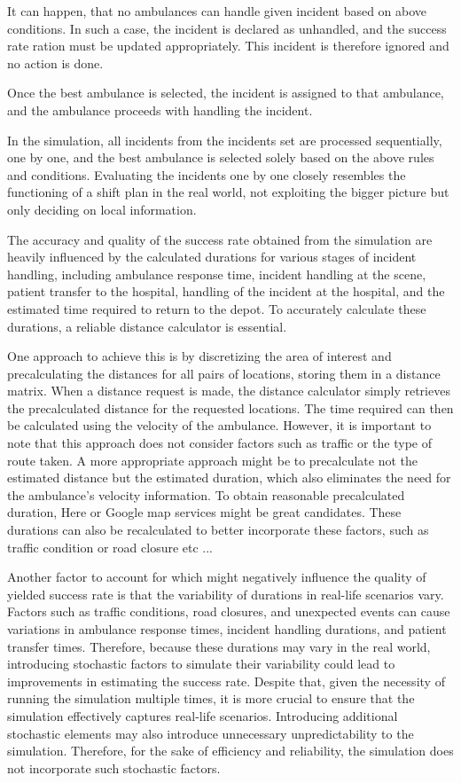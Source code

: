 It can happen, that no ambulances can handle given incident based on above
conditions. In such a case, the incident is declared as unhandled, and the
success rate ration must be updated appropriately. This incident is therefore
ignored and no action is done.

Once the best ambulance is selected, the incident is assigned to that
ambulance, and the ambulance proceeds with handling the incident.

In the simulation, all incidents from the incidents set are processed
sequentially, one by one, and the best ambulance is selected solely based on
the above rules and conditions. Evaluating the incidents one by one closely
resembles the functioning of a shift plan in the real world, not exploiting the
bigger picture but only deciding on local information.

The accuracy and quality of the success rate obtained from the simulation are
heavily influenced by the calculated durations for various stages of incident
handling, including ambulance response time, incident handling at the scene,
patient transfer to the hospital, handling of the incident at the hospital, and
the estimated time required to return to the depot. To accurately calculate
these durations, a reliable distance calculator is essential.

One approach to achieve this is by discretizing the area of interest and
precalculating the distances for all pairs of locations, storing them in a
distance matrix. When a distance request is made, the distance calculator
simply retrieves the precalculated distance for the requested locations. The
time required can then be calculated using the velocity of the ambulance.
However, it is important to note that this approach does not consider factors
such as traffic or the type of route taken. A more appropriate approach might
be to precalculate not the estimated distance but the estimated duration, which
also eliminates the need for the ambulance's velocity information. To obtain
reasonable precalculated duration, Here or Google map services might be great
candidates. These durations can also be recalculated to better incorporate
these factors, such as traffic condition or road closure etc ...

Another factor to account for which might negatively influence the quality of
yielded success rate is that the variability of durations in real-life
scenarios vary. Factors such as traffic conditions, road closures, and
unexpected events can cause variations in ambulance response times, incident
handling durations, and patient transfer times. Therefore, because these
durations may vary in the real world, introducing stochastic factors to
simulate their variability could lead to improvements in estimating the success
rate. Despite that, given the necessity of running the simulation multiple
times, it is more crucial to ensure that the simulation effectively captures
real-life scenarios. Introducing additional stochastic elements may also
introduce unnecessary unpredictability to the simulation. Therefore, for the
sake of efficiency and reliability, the simulation does not incorporate such
stochastic factors.

